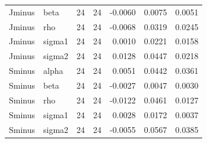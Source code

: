 \begin{tabular}{llrrrrr}
Jminus & beta & 24 & 24 & -0.0060 & 0.0075 & 0.0051 \\
Jminus & rho & 24 & 24 & -0.0068 & 0.0319 & 0.0245 \\
Jminus & sigma1 & 24 & 24 & 0.0010 & 0.0221 & 0.0158 \\
Jminus & sigma2 & 24 & 24 & 0.0128 & 0.0447 & 0.0218 \\
Sminus & alpha & 24 & 24 & 0.0051 & 0.0442 & 0.0361 \\
Sminus & beta & 24 & 24 & -0.0027 & 0.0047 & 0.0030 \\
Sminus & rho & 24 & 24 & -0.0122 & 0.0461 & 0.0127 \\
Sminus & sigma1 & 24 & 24 & 0.0028 & 0.0172 & 0.0037 \\
Sminus & sigma2 & 24 & 24 & -0.0055 & 0.0567 & 0.0385 \\
\bottomrule
\end{tabular}
